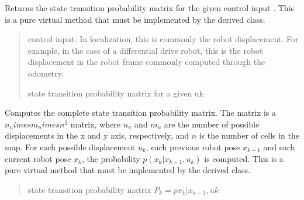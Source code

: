 \documentclass[letterpaper,10pt,english]{sphinxmanual}
\begin{document}
\begin{fulllineitems}
\begin{fulllineitems}
\label{\detokenize{GridLocalization:GL.GL.StateTransitionProbability_4_uk}}
\pysigstartsignatures
{}
\pysigstopsignatures
\sphinxAtStartPar
Returns the state transition probability matrix for the given control input .
This is a pure virtual method that must be implemented by the derived class.
\begin{quote}\begin{description}
\sphinxAtStartPar
{} \textendash{} control input. In localization, this is commonly the robot displacement. For example, in the case of a differential drive robot, this is the robot displacement in the robot frame commonly computed through the odometry.

\sphinxAtStartPar
{} state transition probability matrix for a given uk

\end{description}\end{quote}

\end{fulllineitems}


\begin{fulllineitems}
\label{\detokenize{GridLocalization:GL.GL.StateTransitionProbability}}
\pysigstartsignatures
{}
\pysigstopsignatures
\sphinxAtStartPar
Computes the complete state transition probability matrix. The matrix is a \(n_u   imes m_u        imes n^2\) matrix,
where \(n_u\) and \(m_u\) are the number of possible displacements in the x and y axis, respectively, and
\(n\) is the number of cells in the map. For each possible displacement \(u_k\), each previous robot pose
\({x_{k-1}}\) and each current robot pose \({x_k}\), the probability \(p(x_k|x_{k-1},u_k)\) is computed.
This is a pure virtual method that must be implemented by the derived class.
\begin{quote}\begin{description}
\sphinxAtStartPar
state transition probability matrix \(P_k=p{x_k|x_{k-1},uk}\)


\end{description}
\end{quote}
\end{fulllineitems}
\end{fulllineitems}
\end{document}
